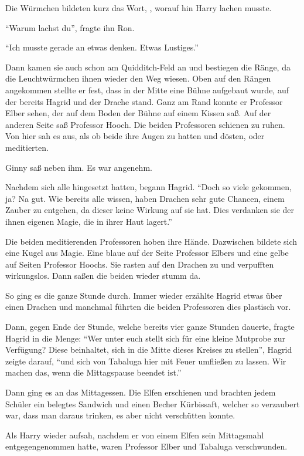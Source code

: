 Die Würmchen bildeten kurz das Wort, , worauf hin Harry lachen musste.

\enquote{Warum lachst du}, fragte ihn Ron.

\enquote{Ich musste gerade an etwas denken. Etwas Lustiges.}

Dann kamen sie auch schon am Quidditch-Feld an und bestiegen die Ränge, da die Leuchtwürmchen ihnen wieder den Weg wiesen. Oben auf den Rängen angekommen stellte er fest, dass in der Mitte eine Bühne aufgebaut wurde, auf der bereits Hagrid und der Drache stand. Ganz am Rand konnte er Professor Elber sehen, der auf dem Boden der Bühne auf einem Kissen saß. Auf der anderen Seite saß Professor Hooch. Die beiden Professoren schienen zu ruhen. Von hier sah es aus, als ob beide ihre Augen zu hatten und dösten, oder meditierten.

Ginny saß neben ihm. Es war angenehm.

Nachdem sich alle hingesetzt hatten, begann Hagrid. \enquote{Doch so viele gekommen, ja? Na gut. Wie bereits alle wissen, haben Drachen sehr gute Chancen, einem Zauber zu entgehen, da dieser keine Wirkung auf sie hat. Dies verdanken sie der ihnen eigenen Magie, die in ihrer Haut lagert.}

Die beiden meditierenden Professoren hoben ihre Hände. Dazwischen bildete sich eine Kugel aus Magie. Eine blaue auf der Seite Professor Elbers und eine gelbe auf Seiten Professor Hoochs. Sie rasten auf den Drachen zu und verpufften wirkungslos. Dann saßen die beiden wieder stumm da.

So ging es die ganze Stunde durch. Immer wieder erzählte Hagrid etwas über einen Drachen und manchmal führten die beiden Professoren dies plastisch vor.

Dann, gegen Ende der Stunde, welche bereits vier ganze Stunden dauerte, fragte Hagrid in die Menge: \enquote{Wer unter euch stellt sich für eine kleine Mutprobe zur Verfügung? Diese beinhaltet, sich in die Mitte dieses Kreises zu stellen}, Hagrid zeigte darauf, \enquote{und sich von Tabaluga hier mit Feuer umfließen zu lassen. Wir machen das, wenn die Mittagspause beendet ist.}

Dann ging es an das Mittagessen. Die Elfen erschienen und brachten jedem Schüler ein belegtes Sandwich und einen Becher Kürbissaft, welcher so verzaubert war, dass man daraus trinken, es aber nicht verschütten konnte.

Als Harry wieder aufsah, nachdem er von einem Elfen sein Mittagsmahl entgegengenommen hatte, waren Professor Elber und Tabaluga verschwunden.




